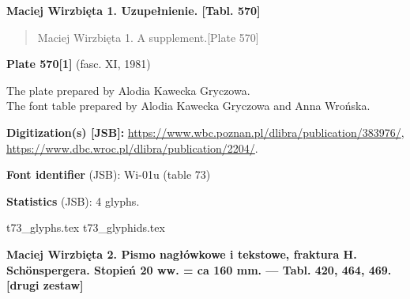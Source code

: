\documentclass[12pt]{article}
\newcommand{\bg}{\begingl}
\newcommand{\pismoPL}[1]{{\relsize{2}\Junicode\textbf{#1}}}
\newcommand{\pismoEN}[1]{{\relsize{1}\Junicode\begin{quote}#1\end{quote}}}
\newcommand{\plate}[3]{\textbf{Plate #1} (fasc. #2, #3)}
\newcommand{\exampleBib}[1]{{\relsize{2}\Junicode\textbf{The
      example:}\\[2ex] CATALOGUS LIBRORUM \textbf{#1}}}
\newcommand{\exampleDesc}[1]{{\relsize{0}\Junicode#1}}
\newcommand{\exampleDig}[1]{{\relsize{0}\Junicode \textbf{Digitization(s) [JSB]:} #1}}
\newcommand{\exampleLib}[1]{{\relsize{0}\Junicode \textbf{Library:} #1}}
\newcommand{\fontID}[2]{{\relsize{1}\Junicode\textbf{Font identifier} (JSB): #1 (table #2)}}
\newcommand{\fontstat}[1]{{\relsize{1}\Junicode\textbf{Statistics} (JSB): #1 glyphs.}}
\newcommand{\exampleRef}[1]{{\relsize{0}\Junicode \textbf{References:} #1}}
\newcommand{\examplePage}[1]{{Page reference: \relsize{0}\Junicode#1}}
\begin{document}
 \pismoPL{Maciej Wirzbięta 1. Uzupełnienie. [Tabl. 570]}
  
 \pismoEN{Maciej Wirzbięta 1. A supplement.[Plate 570]}

\plate{570[1]}{XI}{1981}

The plate prepared by Alodia Kawecka Gryczowa.\\
The font table prepared by Alodia Kawecka Gryczowa and Anna Wrońska.

\bigskip


  




  \exampleDig{\url{https://www.wbc.poznan.pl/dlibra/publication/383976/},
    \url{https://www.dbc.wroc.pl/dlibra/publication/2204/}}.

\bigskip

\fontID{Wi-01u}{73}

\fontstat{4}

  {t73_glyphs.tex}
  {t73_glyphids.tex}


 \newpage
 
% 

 


 \pismoPL{Maciej Wirzbięta 2. Pismo nagłówkowe i tekstowe, fraktura
   H. Schönspergera. Stopień 20 ww. = ca 160 mm. — Tabl. 420, 464,
   469. [drugi zestaw]}
  
\end{document}

